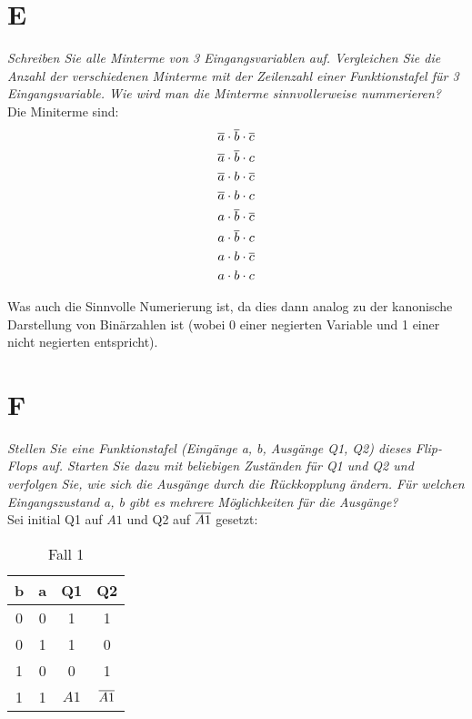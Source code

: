 \section{E}
\textit{Schreiben Sie alle Minterme von 3 Eingangsvariablen auf. Vergleichen Sie die Anzahl der verschiedenen Minterme mit der Zeilenzahl einer Funktionstafel für 3 Eingangsvariable. Wie wird man die Minterme sinnvollerweise nummerieren?}\\

Die Miniterme sind:
\begin{align*}
    \overline{a} \cdot \overline{b} \cdot \overline{c} \\
    \overline{a} \cdot \overline{b} \cdot c \\
    \overline{a} \cdot b \cdot \overline{c} \\
    \overline{a} \cdot b \cdot c \\
    a \cdot \overline{b} \cdot \overline{c} \\
    a \cdot \overline{b} \cdot c \\
    a \cdot b \cdot \overline{c} \\
    a \cdot b \cdot c \\
\end{align*}

Was auch die Sinnvolle Numerierung ist, da dies dann analog zu der kanonische Darstellung von Binärzahlen ist (wobei 0 einer negierten Variable und 1 einer nicht negierten entspricht).

\section{F}
\textit{Stellen Sie eine Funktionstafel (Eingänge a, b, Ausgänge Q1, Q2) dieses Flip-Flops auf. Starten Sie dazu mit beliebigen Zuständen für Q1 und Q2 und verfolgen Sie, wie sich die Ausgänge durch die Rückkopplung ändern. Für welchen Eingangszustand a, b gibt es mehrere Möglichkeiten für die Ausgänge?}\\


Sei initial Q1 auf $A1$ und Q2 auf $\overline{A1}$ gesetzt:

\begin{table}[H]
\centering
\begin{tabular}{cc|c|c}
b&a&Q1&Q2\\\hline
0&0&1&1\\
0&1&1&0\\
1&0&0&1\\
1&1&$A1$&$\overline{A1}$\\
\end{tabular}
\caption{Fall 1}
\label{tab:truthsF1}
\end{table}

